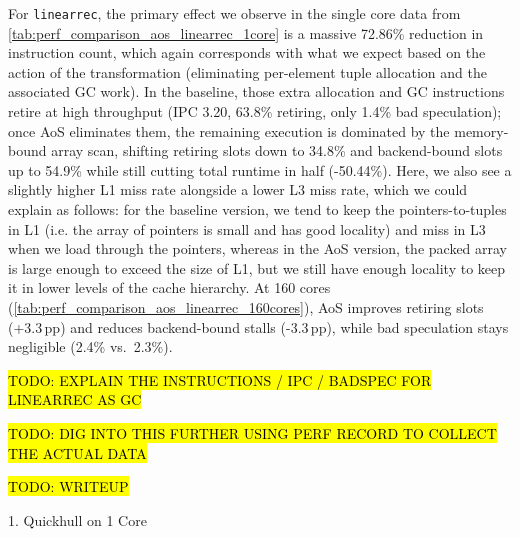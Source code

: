 For \texttt{linearrec}, the primary effect we observe in the single core data
from \cref{tab:perf_comparison_aos_linearrec_1core} is a massive 72.86\%
reduction in instruction count, which again corresponds with what we expect
based on the action of the transformation (eliminating per-element tuple
allocation and the associated GC work). In the baseline, those extra allocation
and GC instructions retire at high throughput (IPC 3.20, 63.8\% retiring, only
1.4\% bad speculation); once AoS eliminates them, the remaining execution is
dominated by the memory-bound array scan, shifting retiring slots down to 34.8\%
and backend-bound slots up to 54.9\% while still cutting total runtime in half
(-50.44\%). Here, we also see a slightly higher L1 miss rate alongside a lower
L3 miss rate, which we could explain as follows: for the baseline version, we
tend to keep the pointers-to-tuples in L1 (i.e. the array of pointers is small
and has good locality) and miss in L3 when we load through the pointers, whereas
in the AoS version, the packed array is large enough to exceed the size of L1,
but we still have enough locality to keep it in lower levels of the cache
hierarchy. At 160 cores (\cref{tab:perf_comparison_aos_linearrec_160cores}),
AoS improves retiring slots (+3.3\,pp) and reduces backend-bound stalls
(-3.3\,pp), while bad speculation stays negligible (2.4\% vs.\ 2.3\%).



\hl{TODO: EXPLAIN THE INSTRUCTIONS / IPC / BADSPEC FOR LINEARREC AS GC}

\hl{TODO: DIG INTO THIS FURTHER USING PERF RECORD TO COLLECT THE ACTUAL DATA}

\hl{TODO: WRITEUP}

  1. Quickhull on 1 Core

